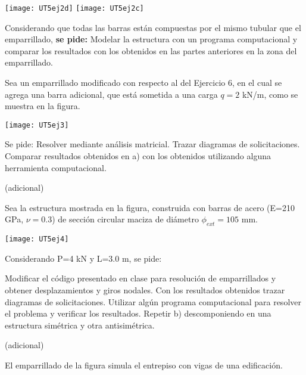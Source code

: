 \begin{center}
	\texttt{[image: UT5ej2d]}
	\hspace{0.02\linewidth}
	\texttt{[image: UT5ej2c]}
\end{center}

Considerando que todas las barras están compuestas por el mismo tubular que el emparrillado, \textbf{se pide: } Modelar la estructura con un programa computacional y comparar los resultados con los obtenidos en las partes anteriores en la zona del emparrillado. 


\ejercicio

Sea un emparrillado modificado con respecto al del Ejercicio 6, en el cual se agrega una barra adicional, que está sometida a una carga $q=2$ kN/m, como se muestra en la figura.

\begin{center}
	\texttt{[image: UT5ej3]}
\end{center}

Se pide:
\parte Resolver mediante análisis matricial. Trazar diagramas de solicitaciones.
\parte Comparar resultados obtenidos en a) con los obtenidos utilizando alguna herramienta computacional.










\ejercicio (adicional)  

Sea la estructura mostrada en la figura, construida con barras de acero (E=210 GPa, $\nu=0.3$) de sección circular maciza de diámetro $\phi_{ext}=105$ mm. 

\begin{center}
	\texttt{[image: UT5ej4]}
\end{center}

Considerando P=4 kN y L=3.0 m, se pide:

\parte Modificar el código presentado en clase para resolución de emparrillados y obtener desplazamientos y giros nodales. Con los resultados obtenidos trazar diagramas de solicitaciones.
\parte Utilizar algún programa computacional para resolver el problema y verificar los resultados.
\parte Repetir b) descomponiendo en una estructura simétrica y otra antisimétrica.




\ejercicio (adicional)  

El emparrillado de la figura simula el entrepiso con vigas de una edificación. 

